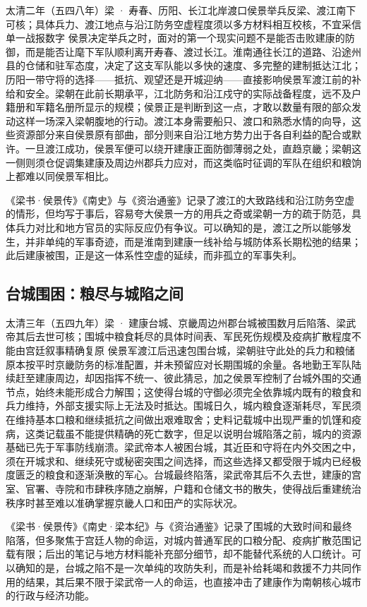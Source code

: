\begin{event}{}{太清二年（五四八年）}{梁 · 寿春、历阳、长江北岸渡口}{侯景举兵反梁、渡江南下可核；具体兵力、渡江地点与沿江防务空虚程度须以多方材料相互校核，不宜采信单一战报数字}
侯景决定举兵之时，面对的第一个现实问题不是能否击败建康的防御，而是能否让麾下军队顺利离开寿春、渡过长江。淮南通往长江的道路、沿途州县的仓储和驻军态度，决定了这支军队能以多快的速度、多完整的建制抵达江北；历阳一带守将的选择——抵抗、观望还是开城迎纳——直接影响侯景军渡江前的补给和安全。梁朝在此前长期承平，江北防务和沿江戍守的实际战备程度，远不及户籍册和军籍名册所显示的规模；侯景正是判断到这一点，才敢以数量有限的部众发动这样一场深入梁朝腹地的行动。渡江本身需要船只、渡口和熟悉水情的向导，这些资源部分来自侯景原有部曲，部分则来自沿江地方势力出于各自利益的配合或默许。一旦渡江成功，侯景军便可以绕开建康正面防御薄弱之处，直趋京畿；梁朝这一侧则须仓促调集建康及周边州郡兵力应对，而这类临时征调的军队在组织和粮饷上都难以同侯景军相比。

《梁书·侯景传》《南史》与《资治通鉴》记录了渡江的大致路线和沿江防务空虚的情形，但均写于事后，容易夸大侯景一方的用兵之奇或梁朝一方的疏于防范，具体兵力对比和地方官员的实际反应仍有争议。可以确知的是，渡江之所以能够发生，并非单纯的军事奇迹，而是淮南到建康一线补给与城防体系长期松弛的结果；此后建康被围，正是这一体系性空虚的延续，而非孤立的军事失利。
\end{event}

\subsection{台城围困：粮尽与城陷之间}

\begin{event}{}{太清三年（五四九年）}{梁 · 建康台城、京畿周边州郡}{台城被围数月后陷落、梁武帝其后去世可核；围城中粮食耗尽的具体时间表、军民死伤规模及疫病扩散程度不能由宫廷叙事精确复原}
侯景军渡江后迅速包围台城，梁朝驻守此处的兵力和粮储原本按平时京畿防务的标准配置，并未预留应对长期围城的余量。各地勤王军队陆续赶至建康周边，却因指挥不统一、彼此猜忌，加之侯景军控制了台城外围的交通节点，始终未能形成合力解围；这使得台城的守御必须完全依靠城内既有的粮食和兵力维持，外部支援实际上无法及时抵达。围城日久，城内粮食逐渐耗尽，军民须在维持基本口粮和继续抵抗之间做出艰难取舍；史料记载城中出现严重的饥馑和疫病，这类记载虽不能提供精确的死亡数字，但足以说明台城陷落之前，城内的资源基础已先于军事防线崩溃。梁武帝本人被困台城，其近臣和守将在内外交困之中，须在开城求和、继续死守或秘密突围之间选择，而这些选择又都受限于城内已经极度匮乏的粮食和逐渐涣散的军心。台城最终陷落，梁武帝其后不久去世，建康的宫室、官署、寺院和市肆秩序随之崩解，户籍和仓储文书的散失，使得战后重建统治秩序时甚至难以准确掌握京畿人口和田产的实际状况。

《梁书·侯景传》《南史·梁本纪》与《资治通鉴》记录了围城的大致时间和最终陷落，但多聚焦于宫廷人物的命运，对城内普通军民的口粮分配、疫病扩散范围记载有限；后出的笔记与地方材料能补充部分细节，却不能替代系统的人口统计。可以确知的是，台城之陷不是一次单纯的攻防失利，而是补给耗竭和救援不力共同作用的结果，其后果不限于梁武帝一人的命运，也直接冲击了建康作为南朝核心城市的行政与经济功能。
\end{event}

